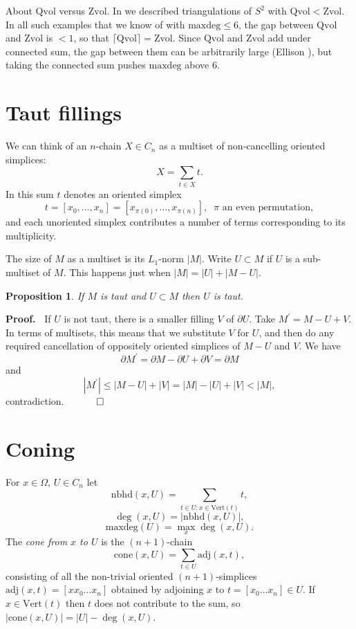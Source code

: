 \documentclass[12pt]{article}
\newtheorem{prop}{Proposition}
\newcommand{\proofstart}{{\noindent \bf Proof.\ }}
\newcommand{\proofend}{$\quad \qed$}
\def\del{\partial}
\newcommand{\kw}{\mathrm}
\newcommand{\cone}{\kw{cone}}
\newcommand{\maxdeg}{\kw{maxdeg}}
\newcommand{\vertices}{\kw{Vert}}
\newcommand{\nbhd}{\kw{nbhd}}
\newcommand{\adj}{\kw{adj}}
\newcommand{\Zvol}{\kw{Zvol}}
\newcommand{\Qvol}{\kw{Qvol}}
\begin{document}
About $\Qvol$ versus $\Zvol$.
In \cite{dew:filling}
we described triangulations of $S^2$ with $\Qvol < \Zvol$.
In all such examples that we know of
with $\maxdeg \leq 6$, the gap between $\Qvol$ and $\Zvol$ is $<1$,
so that
$\lceil \Qvol \rceil = \Zvol$.
Since $\Qvol$ and $\Zvol$
add under connected sum,
the gap between them can be arbitrarily
large
(Ellison \cite{ellison:gap}),
but taking the connected sum pushes $\maxdeg$ above $6$.



\section{Taut fillings}

We can think of an $n$-chain $X \in C_n$ as a multiset of
non-cancelling oriented simplices:
\[
X = \sum_{t \in X} t
.
\]
In this sum $t$ denotes an oriented simplex
\[
t=[x_0,\ldots,x_n]
= [x_{\pi(0)},\ldots,x_{\pi(n)}]
,\;\;\mbox{$\pi$ an even permutation}
,
\]
and each unoriented simplex contributes a number of terms corresponding
to its multiplicity.

The size of $M$ as a multiset is its $L_1$-norm $|M|$.
Write $U \subset M$
if $U$ is a sub-multiset of $M$.
This happens just when
$|M| = |U| + |M-U|$.

\begin{prop} \label{subtaut}
If $M$ is taut and $U \subset M$ then $U$ is taut.
\end{prop}

\proofstart
If $U$ is not taut, there is a smaller filling $V$ of $\del U$.
Take $M^\prime = M-U+V$.
In terms of multisets, this means that we substitute $V$ for $U$,
and then do any required cancellation of oppositely oriented simplices
of $M-U$ and $V$.
We have
\[
\del M^\prime = \del M - \del U + \del V = \del M
\]
and
\[
|M^\prime| \leq |M-U| + |V| = |M| - |U| + |V| < |M|
,
\]
contradiction.
\proofend

\section{Coning}
For $x \in \Omega$, $U \in C_n$ let
\[
\nbhd(x,U) = \sum_{ t \in U: x \in \vertices(t) } t
,
\]
\[
\deg(x,U) = |\nbhd(x,U)|
,
\]
\[
\maxdeg(U) = \max_x \deg(x,U)
.
\]
The \emph{cone from $x$ to $U$}
is the $(n+1)$-chain
\[
\cone(x,U) = 
\sum_{t \in U} \adj(x,t)
,
\]
consisting of all the non-trivial oriented
$(n+1)$-simplices $\adj(x,t)=[x x_0\ldots x_n]$ obtained
by adjoining $x$ to  $t = [x_0\ldots x_n] \in U$.
If $x \in \vertices(t)$ then $t$ does not contribute to the sum,
so $|\cone(x,U)| = |U| - \deg(x,U)$.
\end{document}
